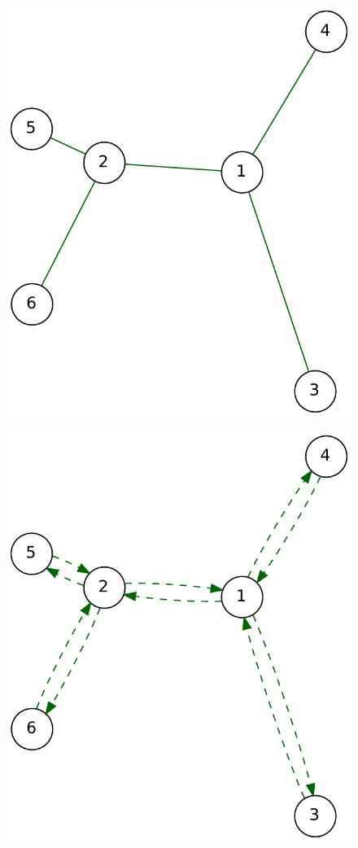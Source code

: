 \begin{figure}[h]
    \centering
    \begin{minipage}{.3\textwidth}
        \centering
        \includegraphics[width=0.8\linewidth]{figures/2approxa}
        \label{fig:sub1}
    \end{minipage}%
    \begin{minipage}{.3\textwidth}
        \centering
        \includegraphics[width=0.8\linewidth]{figures/2approxb}

\end{minipage}
\end{figure}
